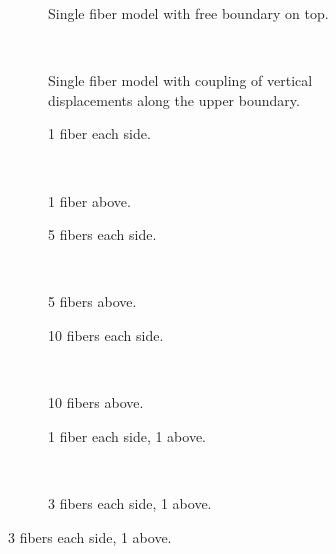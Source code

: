 \documentclass[review]{elsarticle}
\begin{document}
\begin{figure}[!h]
\centering
    \begin{subfigure}[b]{0.45\textwidth}
        \caption{Single fiber model with free boundary on top.}\label{subfig:volfracfreeMI}
    \end{subfigure} ~
    \begin{subfigure}[b]{0.45\textwidth}
        \caption{Single fiber model with coupling of vertical displacements along the upper boundary.}\label{subfig:volfraccouplingMI}
    \end{subfigure}

    \begin{subfigure}[b]{0.45\textwidth}
        \caption{1 fiber each side.}\label{subfig:volfrac1eachsideMI}
    \end{subfigure} ~
    \begin{subfigure}[b]{0.45\textwidth}
        \caption{1 fiber above.}\label{subfig:volfrac1aboveMI}
    \end{subfigure}

    \begin{subfigure}[b]{0.45\textwidth}
        \caption{5 fibers each side.}\label{subfig:volfrac5eachsideMI}
    \end{subfigure} ~
    \begin{subfigure}[b]{0.45\textwidth}
        \caption{5 fibers above.}\label{subfig:volfrac5aboveMI}
    \end{subfigure}

    \begin{subfigure}[b]{0.45\textwidth}
        \caption{10 fibers each side.}\label{subfig:volfrac10eachsideMI}
    \end{subfigure} ~
    \begin{subfigure}[b]{0.45\textwidth}
        \caption{10 fibers above.}\label{subfig:volfrac10aboveMI}
    \end{subfigure}

    \begin{subfigure}[b]{0.45\textwidth}
        \caption{1 fiber each side, 1 above.}\label{subfig:volfrac1eachside1aboveMI}
    \end{subfigure} ~
    \begin{subfigure}[b]{0.45\textwidth}
        \caption{3 fibers each side, 1 above.}\label{subfig:volfrac3eachside1aboveMI}
    \end{subfigure}


\end{figure}
\end{document}
